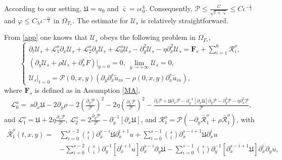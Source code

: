 \documentclass{amsart}
\numberwithin{equation}{section}
\begin{document}
According to our setting, $\mathfrak{U}=u_{0}$ and $\bar{\varsigma}=\iota\epsilon_{0}^{4}$.
Consequently, $\mathcal{P}\leq \frac{C}{\sqrt{t+\bar{\varsigma}}}\leq C\iota^{-\frac{1}{2}}$ and $\varphi\leq C_{\lambda}\iota^{-\frac{\varepsilon_{0}}{2}}$ in $\Omega_{T_{*}}$. The estimate for $\mathcal{U}_{s}$ is relatively straightforward.

From \eqref{app} one knows that $\mathcal{U}_{s}$ obeys the following problem in $\Omega_{T_{*}}$,
\begin{equation}\label{us0}
\begin{cases}
\partial_{t}\mathcal{U}_{s}
+\mathcal{L}_{1}^{o}\partial_{x}\mathcal{U}_{s}
+\mathcal{L}_{2}^{o}\partial_{y}\mathcal{U}_{s}
+\mathcal{L}_{0}^{o}\mathcal{U}_{s}
-\partial_{y}^{2}\mathcal{U}_{s}-\eta\partial_{x}^{2}\mathcal{U}_{s}
=\mathbf{F}_{s}+\sum\limits_{i=1}^{6}\mathcal{R}_{i}^{o},\\
(\partial_{y}\mathcal{U}_{s}+\rho\mathcal{U}_{s}+\partial_{x}^{s}F)|_{y=0}=0,~
\lim\limits_{y\to+\infty} \mathcal{U}_{s}=0,\\
\mathcal{U}_{s}|_{t=0}=\mathcal{P}(0,x,y)(\partial_{y}\partial_{x}^{s}\tilde{u}_{in}-\rho(0,x,y)\partial_{x}^{s}\tilde{u}_{in}),
\end{cases}
\end{equation}
where $\mathbf{F}_{s}$ is defined as in Assumption \ref{MA},
\begin{align*}
\mathcal{L}_{0}^{o}
= ~s\partial_{x}\mathfrak{U}-2\partial_{y}\rho
  -2\left(\frac{\partial_{y}\mathcal{P}}{\mathcal{P}}\right)^{2}-2\eta\left(\frac{\partial_{x}\mathcal{P}}{\mathcal{P}}\right)^{2}
  -\frac{\partial_{t}\mathcal{P}+\mathfrak{U}\partial_{x}\mathcal{P}-\partial_{y}^{-1}[\partial_{x}\mathfrak{U}]\partial_{y}\mathcal{P}-\partial_{y}^{2}\mathcal{P}-\eta\partial_{x}^{2}\mathcal{P}}{\mathcal{P}},
\end{align*}
and $\mathcal{L}_{1}^{o}=\mathfrak{U}+2\eta\frac{\partial_{x}\mathcal{P}}{\mathcal{P}}$,
$\mathcal{L}_{2}^{o}=2\frac{\partial_{y}\mathcal{P}}{\mathcal{P}}-\partial_{y}^{-1}\left[\partial_{x}\mathfrak{U}\right]$,
and $\mathcal{R}_{1}^{o}=\mathcal{P}(-\partial_{y}\bar{\mathcal{R}}_{1}^{o}+\rho \bar{\mathcal{R}}_{1}^{o})$, with
\begin{align*}
\bar{\mathcal{R}}_{1}^{o}(t,x,y)
=& \sum_{i=0}^{s-2}\binom{s}{i}\partial_{x}^{s-i}\mathfrak{U}\partial_{x}^{i+1}u
  +\sum_{i=0}^{s-1}\binom{s}{i}\partial_{x}^{s-i+1}\mathfrak{U}\partial_{x}^{i}u\\
 &-\sum_{i=0}^{s-2}\binom{s}{i}\partial_{y}^{-1}[\partial_{x}^{i+1}u]\partial_{x}^{s-i}\partial_{y}\mathfrak{U}
  -\sum_{i=0}^{s-1}\binom{s}{i}\partial_{y}^{-1}[\partial_{x}^{s-i+1}\mathfrak{U}]\partial_{x}^{i}\partial_{y}u,
\end{align*}
\end{document}
